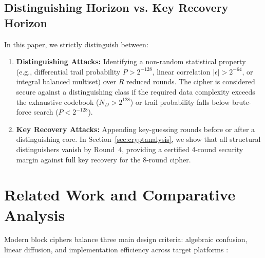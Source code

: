 \documentclass[review,12pt]{elsarticle}
\begin{document}
\subsection{Distinguishing Horizon vs. Key Recovery Horizon}
In this paper, we strictly distinguish between:
\begin{enumerate}
    \item \textbf{Distinguishing Attacks:} Identifying a non-random statistical property (e.g., differential trail probability $P > 2^{-128}$, linear correlation $|\epsilon| > 2^{-64}$, or integral balanced multiset) over $R$ reduced rounds. The cipher is considered secure against a distinguishing class if the required data complexity exceeds the exhaustive codebook ($N_D > 2^{128}$) or trail probability falls below brute-force search ($P < 2^{-128}$).
    \item \textbf{Key Recovery Attacks:} Appending key-guessing rounds before or after a distinguishing core. In Section~\ref{sec:cryptanalysis}, we show that all structural distinguishers vanish by Round~4, providing a certified 4-round security margin against full key recovery for the 8-round cipher.
\end{enumerate}



\section{Related Work and Comparative Analysis}
\label{sec:related_work}

Modern block ciphers balance three main design criteria: algebraic confusion, linear diffusion, and implementation efficiency across target platforms \cite{daemen2002design}:
\end{document}
